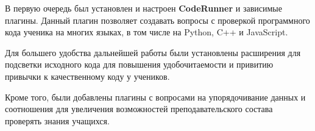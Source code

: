 \documentclass[a4paper,14pt]{article}
\begin{document}
В первую очередь был установлен и настроен \textbf{CodeRunner} и зависимые плагины.
Данный плагин позволяет создавать вопросы с проверкой программного кода ученика на многих языках, в том числе на Python, C++ и JavaScript.

Для большего удобства дальнейшей работы были установлены расширения для подсветки исходного кода для повышения удобочитаемости и привитию привычки к качественному коду у учеников.

Кроме того, были добавлены плагины с вопросами на упорядочивание данных и соотношения для увеличения возможностей преподавательского состава проверять знания учащихся.













\end{document}

